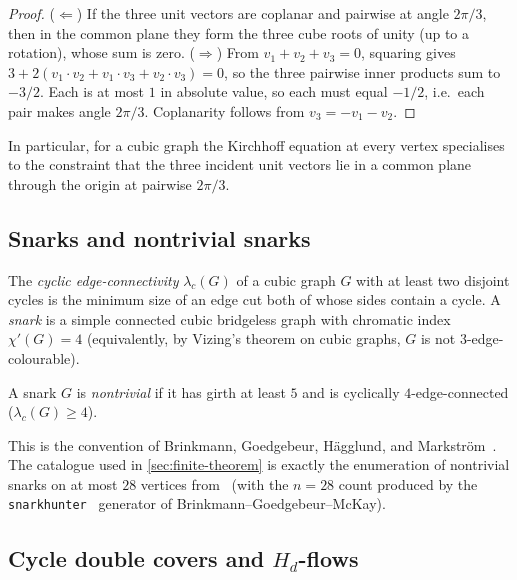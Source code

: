\begin{proof}
($\Leftarrow$) If the three unit vectors are coplanar and pairwise at
angle $2\pi/3$, then in the common plane they form the three cube
roots of unity (up to a rotation), whose sum is zero.
($\Rightarrow$) From $v_1 + v_2 + v_3 = 0$, squaring gives
$3 + 2(v_1{\cdot}v_2 + v_1{\cdot}v_3 + v_2{\cdot}v_3) = 0$, so the
three pairwise inner products sum to $-3/2$. Each is at most $1$ in
absolute value, so each must equal $-1/2$, i.e.\ each pair makes
angle $2\pi/3$. Coplanarity follows from $v_3 = -v_1 - v_2$.
\end{proof}

In particular, for a cubic graph the Kirchhoff equation at every
vertex specialises to the constraint that the three incident unit
vectors lie in a common plane through the origin at pairwise
$2\pi/3$.

\subsection{Snarks and nontrivial snarks}
\label{sec:prelim-snarks}

The \emph{cyclic edge-connectivity} $\lambda_c(G)$ of a cubic graph
$G$ with at least two disjoint cycles is the minimum size of an edge
cut both of whose sides contain a cycle. A \emph{snark} is a simple
connected cubic bridgeless graph with chromatic index $\chi'(G) = 4$
(equivalently, by Vizing's theorem on cubic graphs, $G$ is not
$3$-edge-colourable).

\begin{definition}
\label{def:nontrivial-snark}
A snark $G$ is \emph{nontrivial} if it has girth at least $5$ and is
cyclically $4$-edge-connected ($\lambda_c(G) \ge 4$).
\end{definition}

This is the convention of Brinkmann, Goedgebeur, H{\"a}gglund, and
Markstr{\"o}m~\cite{BGHM13}. The catalogue used in \cref{sec:finite-theorem}
is exactly the enumeration of nontrivial snarks on at most $28$
vertices from~\cite{BGHM13} (with the $n = 28$ count produced by the
\texttt{snarkhunter}~\cite{snarkhunter} generator of
Brinkmann--Goedgebeur--McKay).

\subsection{Cycle double covers and $H_d$-flows}
\label{sec:prelim-cdc}


